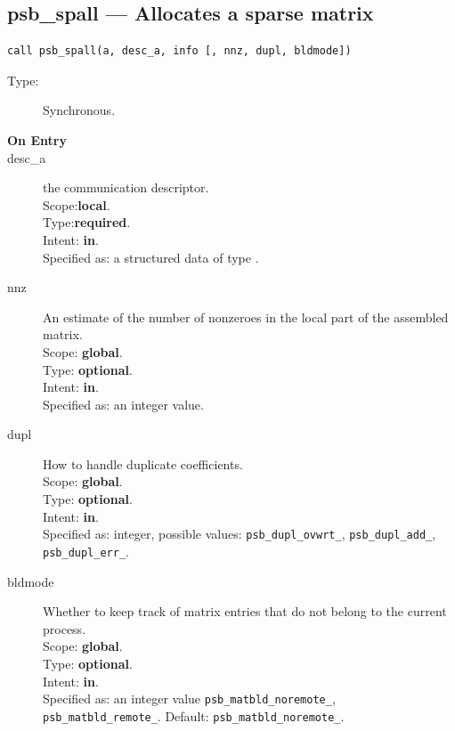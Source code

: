 


%
%
\clearpage\subsection{psb\_spall --- Allocates a sparse matrix}

\begin{verbatim}
call psb_spall(a, desc_a, info [, nnz, dupl, bldmode])
\end{verbatim}

\begin{description}
\item[Type:] Synchronous.
\item[\bf On Entry]
\item[desc\_a] the communication descriptor.\\
Scope:{\bf local}.\\
Type:{\bf required}.\\
Intent: {\bf in}.\\
Specified as: a structured data of type \descdata.
\item[nnz] An estimate of the number of nonzeroes in the local
  part of the assembled matrix.\\ 
Scope: {\bf global}.\\
Type: {\bf optional}.\\
Intent: {\bf in}.\\
Specified as: an integer value. 
\item[dupl] How to handle duplicate coefficients.\\
Scope: {\bf global}.\\
Type: {\bf optional}.\\
Intent: {\bf in}.\\
Specified as: integer, possible values: \verb|psb_dupl_ovwrt_|,
\verb|psb_dupl_add_|, \verb|psb_dupl_err_|.
\item[bldmode] Whether to keep track of matrix entries that do not
  belong to the current process.\\ 
Scope: {\bf global}.\\
Type: {\bf optional}.\\
Intent: {\bf in}.\\
Specified as: an integer value \verb|psb_matbld_noremote_|,
\verb|psb_matbld_remote_|.  Default:  \verb|psb_matbld_noremote_|.
\end{description}


